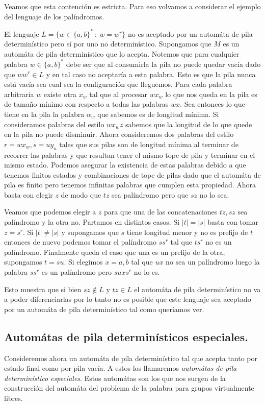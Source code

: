 \documentclass[tesis.tex]{subfiles}
\newcommand{\APD}{automáta de pila determinístico }
\begin{document}
Veamos que esta contención es estricta. Para eso volvamos a considerar el ejemplo del lenguaje de los palíndromos.
\begin{ej}
	El lenguaje $L = \{ w \in \{ a,b \}^*  \ : \ w = w^r \}$ no es aceptado por un \APD pero sí por uno no determinístico. Supongamos que $M$ es un \APD que lo acepta. Notemos que para cualquier palabra $w \in \{ a,b \}^*$ debe ser que al consumirla la pila no puede quedar vacía dado que $ww^r \in L$ y en tal caso no aceptaría a esta palabra. Esto es que la pila nunca está vacía sea cual sea la configuración que lleguemos. Para cada palabra arbitraria $w$ existe otra $x_w$ tal que al procesar $wx_w$ lo que nos queda en la pila es de tamaño mínimo con respecto a todas las palabras $wx$. Sea entonces lo que tiene en la pila la palabra $\alpha_w$ que sabemos es de longitud mínima. Si consideramos palabras del estilo $wx_wz$ sabemos que la longitud de lo que quede en la pila no puede disminuir. Ahora consideremos dos palabras del estilo $r=wx_w, s=uy_u$ tales que sus pilas son de longitud mínima al terminar de recorrer las palabras y que resultan tener el mismo tope de pila y terminar en el mismo estado. Podemos asegurar la existencia de estas palabras debido a que tenemos finitos estados y combinaciones de tope de pilas dado que el automáta de pila es finito pero tenemos infinitas palabras que cumplen esta propiedad. Ahora basta con elegir $z$ de modo que $tz$ sea palíndromo pero que $sz$ no lo sea. 
	
	Veamos que podemos elegir a $z$ para que una de las concatenaciones $tz,sz$ sea palíndromo y la otra no. Partamos en distintos casos. Si $|t|=|s|$ basta con tomar $z=s^r$. Si $|t|\neq |s|$ y supongamos que $s$ tiene longitud menor y no es prefijo de $t$ entonces de nuevo podemos tomar el palíndromo $ss^r$ tal que $ts^r$ no es un palíndromo. Finalmente queda el caso que una es un prefijo de la otra, supongamos $t=su$. Si elegimos $x=a,b$ tal que $ux$ no sea un palíndromo luego la palabra $ss^r$ es un palíndromo pero $suxs^r$ no lo es.
	
	Esto muestra que si bien $sz \notin L$ y $tz \in L$ el \APD no va a poder diferenciarlas por lo tanto no es posible que este lenguaje sea aceptado por un \APD tal como queríamos ver.
	
\end{ej}

\subsection{Automátas de pila determinísticos especiales.} Consideremos ahora un \APD tal que acepta tanto por estado final como por pila vacía. A estos los llamaremos \textit{automátas de pila determinístico especiales}.  
Estos automátas son los que nos surgen de la construcción del automáta del problema de la palabra  para grupos virtualmente libres. 
\end{document}
